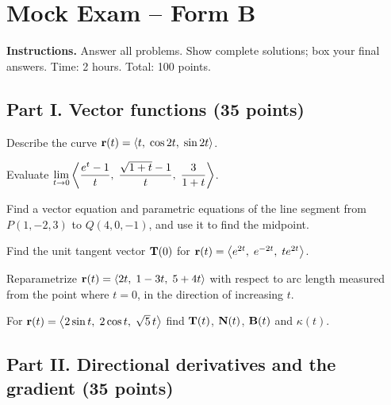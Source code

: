 \section{Mock Exam -- Form B}\label{ch:exam-b}

\textbf{Instructions.} Answer all problems. Show complete solutions; box your
final answers. Time: 2 hours. Total: 100 points.

\subsection*{Part I. Vector functions (35 points)}

\begin{questions}
\item Describe the curve $\mathbf{r}(t)=\left\langle t,\;\cos2t,\;\sin2t \right\rangle$. 
\item Evaluate $\displaystyle\lim_{t\to0}\left\langle \frac{e^t-1}{t},\;\frac{\sqrt{1+t}-1}{t},\;\frac{3}{1+t} \right\rangle$. 
\item Find a vector equation and parametric equations of the line segment from
      $P(1,-2,3)$ to $Q(4,0,-1)$, and use it to find the midpoint. 
\item Find the unit tangent vector $\mathbf{T}(0)$ for
      $\mathbf{r}(t)=\left\langle e^{2t},\;e^{-2t},\;te^{2t} \right\rangle$. 
\item Reparametrize $\mathbf{r}(t)=\left\langle 2t,\;1-3t,\;5+4t \right\rangle$ with respect to arc length
      measured from the point where $t=0$, in the direction of increasing $t$. 
\item For $\mathbf{r}(t)=\left\langle 2\sin t,\;2\cos t,\;\sqrt5\,t \right\rangle$ find $\mathbf{T}(t)$, $\mathbf{N}(t)$,
      $\mathbf{B}(t)$ and $\kappa(t)$. 
\end{questions}

\subsection*{Part II. Directional derivatives and the gradient (35 points)}

